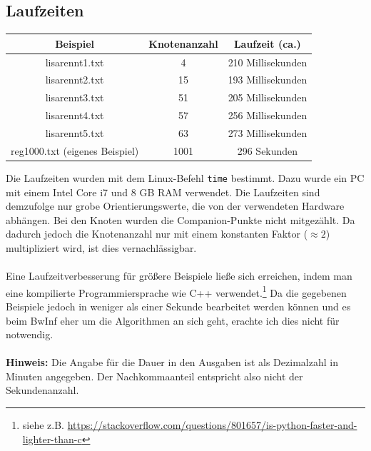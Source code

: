 \documentclass[a4paper, notitlepage, 12pt]{scrartcl}
\begin{document}
\subsection*{Laufzeiten}
 \begin{table}[H]
	\begin{tabular}{|c|c|c|} 
		\hline
		Beispiel                                      & Knotenanzahl & Laufzeit (ca.)       \\ \hline \hline
		lisarennt1.txt                              & 4     & 210 Millisekunden    \\
		lisarennt2.txt                              & 15      & 193 Millisekunden     \\
		lisarennt3.txt                              & 51      & 205 Millisekunden     \\
		lisarennt4.txt                              & 57      & 256 Millisekunden    \\
		lisarennt5.txt                              & 63      & 273 Millisekunden    \\
		reg1000.txt (eigenes Beispiel)				& 1001    & 296 Sekunden \\ \hline
	\end{tabular}
\end{table}
Die Laufzeiten wurden mit dem Linux-Befehl \texttt{time} bestimmt. Dazu wurde ein PC mit einem Intel Core i7 und 8 GB RAM verwendet. Die Laufzeiten sind demzufolge nur grobe Orientierungswerte, die von der verwendeten Hardware abhängen. Bei den Knoten wurden die Companion-Punkte nicht mitgezählt. Da dadurch jedoch die Knotenanzahl nur mit einem konstanten Faktor ($\approx 2$) multipliziert wird, ist dies vernachlässigbar. \\ \\
Eine Laufzeitverbesserung für größere Beispiele ließe sich erreichen, indem man eine kompilierte Programmiersprache wie C++ verwendet.\footnote{siehe z.B. \url{https://stackoverflow.com/questions/801657/is-python-faster-and-lighter-than-c}} Da die gegebenen Beispiele jedoch in weniger als einer Sekunde bearbeitet werden können und es beim BwInf eher um die Algorithmen an sich geht, erachte ich dies nicht für notwendig. \\ \\
\textbf{Hinweis:} Die Angabe für die Dauer in den Ausgaben ist als Dezimalzahl in Minuten angegeben. Der Nachkommaanteil entspricht also nicht der Sekundenanzahl.
\end{document}
